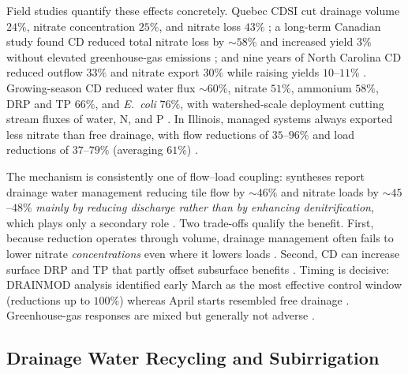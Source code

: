 Field studies quantify these effects concretely. Quebec CDSI cut drainage
volume $24\%$, nitrate concentration $25\%$, and nitrate loss $43\%$
\parencite{Ng2000}; a long-term Canadian study found CD reduced total nitrate
loss by $\sim58\%$ and increased yield $3\%$ without elevated greenhouse-gas
emissions \parencite{Madramootoo2024}; and nine years of North Carolina CD
reduced outflow $33\%$ and nitrate export $30\%$ while raising yields
$10$--$11\%$ \parencite{Poole2018}. Growing-season CD reduced water flux
$\sim60\%$, nitrate $51\%$, ammonium $58\%$, DRP and TP $66\%$, and
\emph{E.\ coli} $76\%$, with watershed-scale deployment cutting stream fluxes
of water, N, and P \parencite{Sunohara2016,Sunohara2015}. In Illinois, managed
systems always exported less nitrate than free drainage, with flow reductions
of $35$--$96\%$ and load reductions of $37$--$79\%$ (averaging $61\%$)
\parencite{Cooke2012}.

The mechanism is consistently one of flow--load coupling: syntheses report
drainage water management reducing tile flow by $\sim46\%$ and nitrate loads by
$\sim45$--$48\%$ \emph{mainly by reducing discharge rather than by enhancing
denitrification}, which plays only a secondary role
\parencite{Ross2016,Ward2018}. Two trade-offs qualify the benefit. First,
because reduction operates through volume, drainage management often fails to
lower nitrate \emph{concentrations} even where it lowers loads
\parencite{Grenon2023,Wesström2014}. Second, CD can increase surface DRP and TP
that partly offset subsurface benefits \parencite{King2022,Wu2025}. Timing is
decisive: DRAINMOD analysis identified early March as the most effective
control window (reductions up to $100\%$) whereas April starts resembled free
drainage \parencite{Kesicka2023c}. Greenhouse-gas responses are mixed but
generally not adverse \parencite{Madramootoo2024,Smith2019}.

\subsection{Drainage Water Recycling and Subirrigation}

